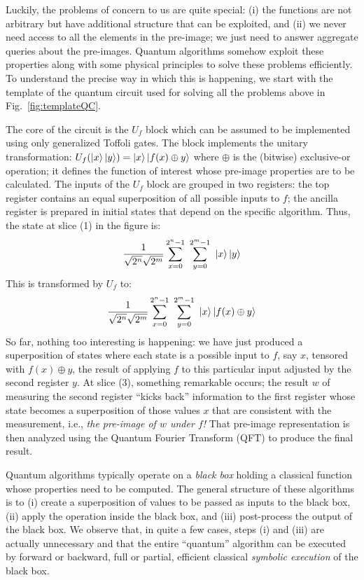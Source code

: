 \documentclass{article}
\begin{document}
\begin{refsection}
Luckily, the problems of concern to us are quite special: (i) the
functions are not arbitrary but have additional structure that can be
exploited, and (ii) we never need access to all the elements in the
pre-image; we just need to answer aggregate queries about the
pre-images. Quantum algorithms somehow exploit these properties along
with some physical principles to solve these problems efficiently. To
understand the precise way in which this is happening, we start with
the template of the quantum circuit used for solving all the problems
above in Fig.~\ref{fig:templateQC}.

The core of the circuit is the $U_f$ block which can be assumed to be
implemented using only generalized Toffoli gates. The block implements
the unitary transformation: $U_f(\ket{x}\ket{y}) = \ket{x}\ket{f(x)
  \oplus y}$ where $\oplus$ is the (bitwise) exclusive-or operation;
it defines the function of interest whose pre-image properties are to
be calculated. The inputs of the $U_f$ block are grouped in two
registers: the top register contains an equal superposition of all
possible inputs to $f$; the ancilla register is prepared in initial
states that depend on the specific algorithm. Thus, the state at slice
(1) in the figure is:
  \[
  \frac{1}{\sqrt{2^n}\sqrt{2^m}}\sum_{x=0}^{2^n-1} ~\sum_{y=0}^{2^m-1} ~\ket{x}\ket{y}
  \]
This is transformed by $U_f$ to:
  \[
  \frac{1}{\sqrt{2^n}\sqrt{2^m}}
  \sum_{x=0}^{2^n-1} ~\sum_{y=0}^{2^m-1} ~\ket{x}\ket{f(x)\oplus y}
  \]
So far, nothing too interesting is happening: we have just produced a
superposition of states where each state is a possible input to $f$,
say $x$, tensored with $f(x) \oplus y$, the result of applying $f$ to
this particular input adjusted by the second register $y$. At slice
(3), something remarkable occurs; the result $w$ of measuring the
second register ``kicks back'' information to the first register whose
state becomes a superposition of those values $x$ that are consistent
with the measurement, i.e., \emph{the pre-image of $w$ under $f$!}
That pre-image representation is then analyzed using the Quantum
Fourier Transform (QFT) to produce the final result.

Quantum algorithms typically operate on a \emph{black box} holding a
classical function whose properties need to be computed. The general
structure of these algorithms is to (i) create a superposition of
values to be passed as inputs to the black box, (ii) apply the
operation inside the black box, and (iii) post-process the output of
the black box. We observe that, in quite a few cases, steps (i) and
(iii) are actually unnecessary and that the entire ``quantum''
algorithm can be executed by forward or backward, full or partial,
efficient classical \emph{symbolic execution} of the black box.



\end{refsection}
\end{document}
